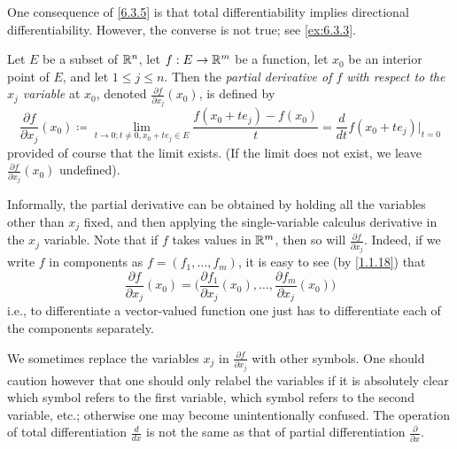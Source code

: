 \begin{rmk}\label{6.3.6}
  One consequence of \cref{6.3.5} is that total differentiability implies directional differentiability.
  However, the converse is not true;
  see \cref{ex:6.3.3}.
\end{rmk}

\begin{defn}\label{6.3.7}
  Let \(E\) be a subset of \(\mathbb{R}^n\), let \(f : E \to \mathbb{R}^m\) be a function, let \(x_0\) be an interior point of \(E\), and let \(1 \leq j \leq n\).
  Then the \emph{partial derivative of \(f\) with respect to the \(x_j\) variable} at \(x_0\), denoted \(\frac{\partial f}{\partial x_j}(x_0)\), is defined by
  \[
    \frac{\partial f}{\partial x_j}(x_0) \coloneqq \lim_{t \to 0 ; t \neq 0, x_0 + t e_j \in E} \frac{f(x_0 + t e_j) - f(x_0)}{t} = \frac{d}{dt} f(x_0 + t e_j)|_{t = 0}
  \]
  provided of course that the limit exists.
  (If the limit does not exist, we leave \(\frac{\partial f}{\partial x_j}(x_0)\) undefined).
\end{defn}

\begin{ac}\label{ac:6.3.1}
  Informally, the partial derivative can be obtained by holding all the variables other than \(x_j\) fixed, and then applying the single-variable calculus derivative in the \(x_j\) variable.
  Note that if \(f\) takes values in \(\mathbb{R}^m\), then so will \(\frac{\partial f}{\partial x_j}\).
  Indeed, if we write \(f\) in components as \(f = (f_1, \dots, f_m)\), it is easy to see (by \cref{1.1.18}) that
  \[
    \frac{\partial f}{\partial x_j}(x_0) = \bigg(\frac{\partial f_1}{\partial x_j}(x_0), \dots, \frac{\partial f_m}{\partial x_j}(x_0)\bigg)
  \]
  i.e., to differentiate a vector-valued function one just has to differentiate each of the components separately.
\end{ac}

\begin{note}
  We sometimes replace the variables \(x_j\) in \(\frac{\partial f}{\partial x_j}\) with other symbols.
  One should caution however that one should only relabel the variables if it is absolutely clear which symbol refers to the first variable, which symbol refers to the second variable, etc.;
  otherwise one may become unintentionally confused.
  The operation of total differentiation \(\frac{d}{dx}\) is not the same as that of partial differentiation \(\frac{\partial}{\partial x}\).
\end{note}

